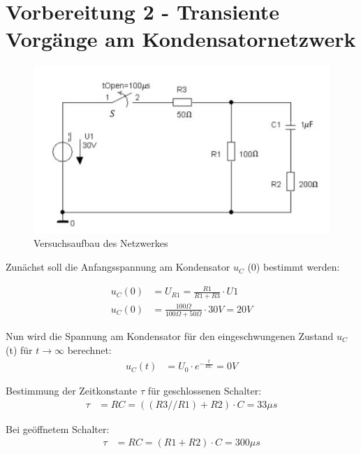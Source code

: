 \documentclass{article}
\begin{document}
\newpage
\thispagestyle{empty}

\tableofcontents


\newpage

\section{Vorbereitung 2 - Transiente Vorgänge am Kondensatornetzwerk}

\begin{figure}[h]
  \begin{center}
    \includegraphics[scale=1]{../assets/images/ET2P5/vorbereitung 2.jpg}
    \caption{Versuchsaufbau des Netzwerkes}
  \end{center}
\end{figure}

Zunächst soll die Anfangsspannung am Kondensator $u_C$ (0) bestimmt werden:

\begin{align*}
  u_C(0) &= U_{R1} = \frac{R1}{R1+R3} \cdot U1 \\
  u_C(0) &= \frac{100\Omega}{100\Omega + 50\Omega} \cdot 30V = 20V
\end{align*}

Nun wird die Spannung am Kondensator für den eingeschwungenen Zustand $u_C$ (t) für $t \rightarrow \infty$ berechnet:
\begin{align*}
  u_C(t)&= U_0 \cdot e^{-\frac{t}{RC}} = 0V
\end{align*}

Bestimmung der Zeitkonstante $\tau$ für geschlossenen Schalter:
\begin{align*}
  \tau &= RC = ((R3 // R1) + R2) \cdot C = 33\mu s
\end{align*}

Bei geöffnetem Schalter:
\begin{align*}
  \tau &= RC = (R1 + R2) \cdot C = 300\mu s
\end{align*}
\end{document}
